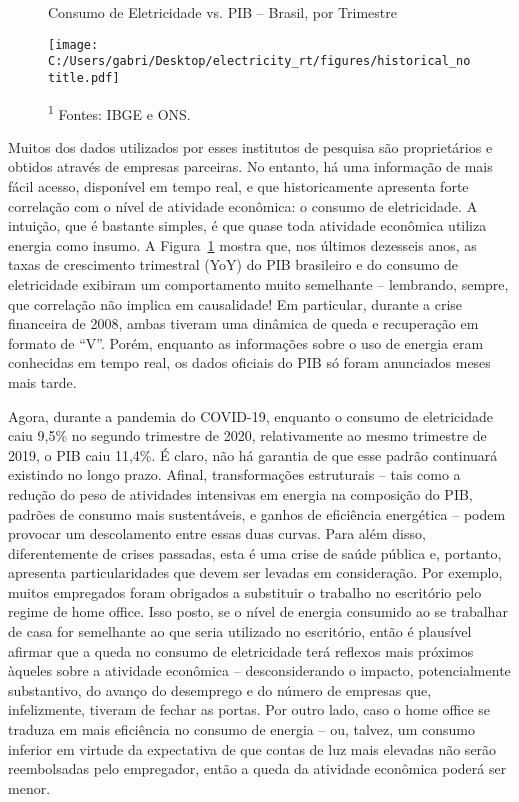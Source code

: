 \documentclass[12pt]{article}
\begin{document}
\begin{figure}[!bp]
	\centering
	\caption{Consumo de Eletricidade vs. PIB -- Brasil, por Trimestre}
	\label{fig:figure1}
	\texttt{[image: C:/Users/gabri/Desktop/electricity\_rt/figures/historical\_notitle.pdf]}	
	\caption*{\textsuperscript{1} Fontes: IBGE e ONS.}
\end{figure}
	
Muitos dos dados utilizados por esses institutos de pesquisa são proprietários e obtidos através de empresas parceiras. No entanto, há uma informação de mais fácil acesso, disponível em tempo real, e que historicamente apresenta forte correlação com o nível de atividade econômica: o consumo de eletricidade. A intuição, que é bastante simples, é que quase toda atividade econômica utiliza energia como insumo. A Figura~{\ref{fig:figure1}} mostra que, nos últimos dezesseis anos, as taxas de crescimento trimestral (YoY) do PIB brasileiro e do consumo de eletricidade exibiram um comportamento muito semelhante -- lembrando, sempre, que correlação não implica em causalidade! Em particular, durante a crise financeira de 2008, ambas tiveram uma dinâmica de queda e recuperação em formato de ``V''. Porém, enquanto as informações sobre o uso de energia eram conhecidas em tempo real, os dados oficiais do PIB só foram anunciados meses mais tarde. 

Agora, durante a pandemia do COVID-19, enquanto o consumo de eletricidade caiu 9,5\% no segundo trimestre de 2020, relativamente ao mesmo trimestre de 2019, o PIB caiu 11,4\%. É claro, não há garantia de que esse padrão continuará existindo no longo prazo. Afinal, transformações estruturais -- tais como a redução do peso de atividades intensivas em energia na composição do PIB, padrões de consumo mais sustentáveis, e ganhos de eficiência energética -- podem provocar um descolamento entre essas duas curvas. Para além disso, diferentemente de crises passadas, esta é uma crise de saúde pública e, portanto, apresenta particularidades que devem ser levadas em consideração. Por exemplo, muitos empregados foram obrigados a substituir o trabalho no escritório pelo regime de home office. Isso posto, se o nível de energia consumido ao se trabalhar de casa for semelhante ao que seria utilizado no escritório, então é plausível afirmar que a queda no consumo de eletricidade terá reflexos mais próximos àqueles sobre a atividade econômica -- desconsiderando o impacto, potencialmente substantivo, do avanço do desemprego e do número de empresas que, infelizmente, tiveram de fechar as portas. Por outro lado, caso o home office se traduza em mais eficiência no consumo de energia -- ou, talvez, um consumo inferior em virtude da expectativa de que contas de luz mais elevadas não serão reembolsadas pelo empregador, então a queda da atividade econômica poderá ser menor.
\end{document}
